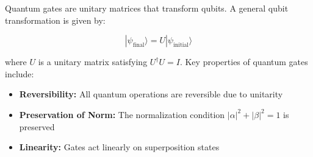 Quantum gates are unitary matrices that transform qubits. A general qubit
transformation is given by:

\[
  |\psi_{\text{final}}\rangle = U |\psi_{\text{initial}}\rangle
\]

\noindent
where $U$ is a unitary matrix satisfying $U^\dagger U = I$. Key properties of
quantum gates include:

\begin{itemize}
  \item \textbf{Reversibility:} All quantum operations are reversible due
    to unitarity
  \item \textbf{Preservation of Norm:} The normalization condition
    $|\alpha|^2 + |\beta|^2 = 1$ is preserved
  \item \textbf{Linearity:} Gates act linearly on superposition states
\end{itemize}



